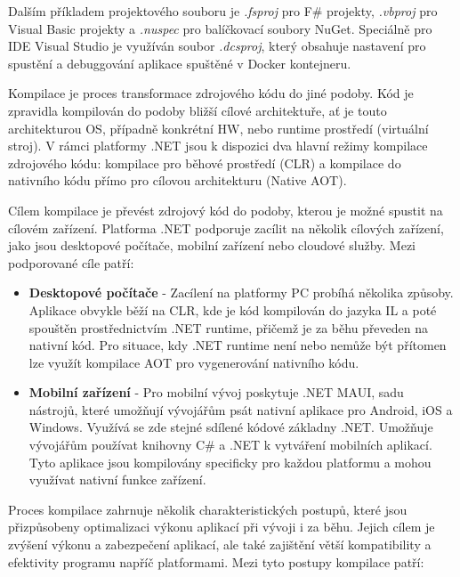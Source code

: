Dalším příkladem projektového souboru je \emph{.fsproj} pro F\# projekty, \emph{.vbproj} pro Visual Basic projekty a \emph{.nuspec} pro balíčkovací soubory NuGet. Speciálně pro IDE Visual Studio je využíván soubor \emph{.dcsproj}, který obsahuje nastavení pro spustění a debuggování aplikace spuštěné v Docker kontejneru. 


Kompilace je proces transformace zdrojového kódu do jiné podoby. Kód je zpravidla kompilován do podoby bližší cílové architektuře, ať je touto architekturou OS, případně konkrétní HW, nebo runtime prostředí (virtuální stroj). V rámci platformy .NET jsou k dispozici dva hlavní režimy kompilace zdrojového kódu: kompilace pro běhové prostředí (CLR) a kompilace do nativního kódu přímo pro cílovou architekturu (Native AOT). \cite{Price2023}


Cílem kompilace je převést zdrojový kód do podoby, kterou je možné spustit na cílovém zařízení. Platforma .NET podporuje zacílit na několik cílových zařízení, jako jsou desktopové počítače, mobilní zařízení nebo cloudové služby. Mezi podporované cíle patří:

\begin{itemize}
    \item \textbf{Desktopové počítače} - Zacílení na platformy PC probíhá několika způsoby. Aplikace obvykle běží na CLR, kde je kód kompilován do jazyka IL a poté spouštěn prostřednictvím .NET runtime, přičemž je za běhu převeden na nativní kód. Pro situace, kdy .NET runtime není nebo nemůže být přítomen lze využít kompilace AOT pro vygenerování nativního kódu.
    \item \textbf{Mobilní zařízení} - Pro mobilní vývoj poskytuje .NET MAUI, sadu nástrojů, které umožňují vývojářům psát nativní aplikace pro Android, iOS a Windows. Využívá se zde stejné sdílené kódové základny .NET. Umožňuje vývojářům používat knihovny C\# a .NET k vytváření mobilních aplikací. Tyto aplikace jsou kompilovány specificky pro každou platformu a mohou využívat nativní funkce zařízení.
\end{itemize}


Proces kompilace zahrnuje několik charakteristických postupů, které jsou přizpůsobeny optimalizaci výkonu aplikací při vývoji i za běhu. Jejich cílem je zvýšení výkonu a zabezpečení aplikací, ale také zajištění větší kompatibility a efektivity programu napříč platformami. Mezi tyto postupy kompilace patří:

